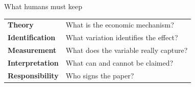 \begin{frame}{What humans must keep}
  \vspace{0.2cm}
  \begin{center}
  \begin{tabularx}{0.92\linewidth}{>{\bfseries\color{deepblue}}lX}
  \toprule
  Theory & What is the economic mechanism?\\
  Identification & What variation identifies the effect?\\
  Measurement & What does the variable really capture?\\
  Interpretation & What can and cannot be claimed?\\
  Responsibility & Who signs the paper?\\
  \bottomrule
  \end{tabularx}
  \end{center}
  \vspace{0.4cm}
\end{frame}

